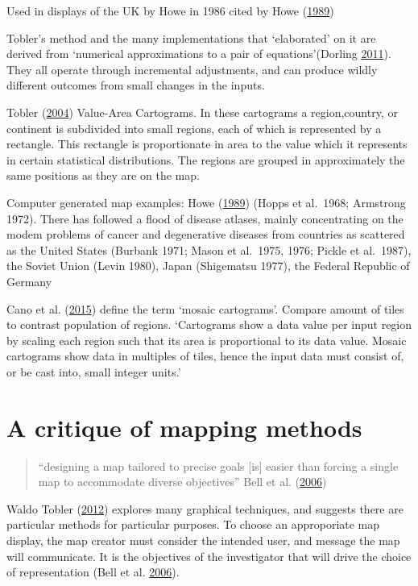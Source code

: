 \documentclass[11pt,]{article}
\begin{document}
Used in displays of the UK by Howe in 1986 cited by Howe
(\protect\hyperlink{ref-HEDP}{1989})

Tobler's method and the many implementations that `elaborated' on it are
derived from `numerical approximations to a pair of equations'(Dorling
\protect\hyperlink{ref-ACTUC}{2011}). They all operate through
incremental adjustments, and can produce wildly different outcomes from
small changes in the inputs.

Tobler (\protect\hyperlink{ref-TFYCC}{2004}) Value-Area Cartograms. In
these cartograms a region,country, or continent is subdivided into small
regions, each of which is represented by a rectangle. This rectangle is
proportionate in area to the value which it represents in certain
statistical distributions. The regions are grouped in approximately the
same positions as they are on the map.

Computer generated map examples: Howe
(\protect\hyperlink{ref-HEDP}{1989}) (Hopps et al.~1968; Armstrong
1972). There has followed a flood of disease atlases, mainly
concentrating on the modem problems of cancer and degenerative diseases
from countries as scattered as the United States (Burbank 1971; Mason et
al.~1975, 1976; Pickle et al.~1987), the Soviet Union (Levin 1980),
Japan (Shigematsu 1977), the Federal Republic of Germany

Cano et al. (\protect\hyperlink{ref-MDAC}{2015}) define the term `mosaic
cartograms'. Compare amount of tiles to contrast population of regions.
`Cartograms show a data value per input region by scaling each region
such that its area is proportional to its data value. Mosaic cartograms
show data in multiples of tiles, hence the input data must consist of,
or be cast into, small integer units.'

\hypertarget{a-critique-of-mapping-methods}{%
\section{A critique of mapping
methods}\label{a-critique-of-mapping-methods}}

\begin{quote}
``designing a map tailored to precise goals {[}is{]} easier than forcing
a single map to accommodate diverse objectives'' Bell et al.
(\protect\hyperlink{ref-CPISACA}{2006})
\end{quote}

Waldo Tobler (\protect\hyperlink{ref-TVSSS}{2012}) explores many
graphical techniques, and suggests there are particular methods for
particular purposes. To choose an approporiate map display, the map
creator must consider the intended user, and message the map will
communicate. It is the objectives of the investigator that will drive
the choice of representation (Bell et al.
\protect\hyperlink{ref-CPISACA}{2006}).
\end{document}
